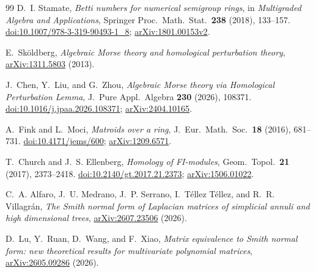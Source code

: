 \documentclass[11pt]{article}
\theoremstyle{definition}
\theoremstyle{remark}
\begin{document}
\begin{thebibliography}{99}
D.~I. Stamate,
\emph{Betti numbers for numerical semigroup rings},
in \emph{Multigraded Algebra and Applications}, Springer Proc.\ Math.\ Stat.\ \textbf{238} (2018), 133--157.
\href{https://doi.org/10.1007/978-3-319-90493-1_8}{doi:10.1007/978-3-319-90493-1\_8};
\href{https://arxiv.org/abs/1801.00153}{arXiv:1801.00153v2}.

E.~Sk\"oldberg,
\emph{Algebraic Morse theory and homological perturbation theory},
\href{https://arxiv.org/abs/1311.5803}{arXiv:1311.5803} (2013).

J.~Chen, Y.~Liu, and G.~Zhou,
\emph{Algebraic Morse theory via Homological Perturbation Lemma},
J.\ Pure Appl.\ Algebra \textbf{230} (2026), 108371.
\href{https://doi.org/10.1016/j.jpaa.2026.108371}{doi:10.1016/j.jpaa.2026.108371};
\href{https://arxiv.org/abs/2404.10165}{arXiv:2404.10165}.

A.~Fink and L.~Moci,
\emph{Matroids over a ring},
J.\ Eur.\ Math.\ Soc.\ \textbf{18} (2016), 681--731.
\href{https://doi.org/10.4171/jems/600}{doi:10.4171/jems/600};
\href{https://arxiv.org/abs/1209.6571}{arXiv:1209.6571}.

T.~Church and J.~S. Ellenberg,
\emph{Homology of FI-modules},
Geom.\ Topol.\ \textbf{21} (2017), 2373--2418.
\href{https://doi.org/10.2140/gt.2017.21.2373}{doi:10.2140/gt.2017.21.2373};
\href{https://arxiv.org/abs/1506.01022}{arXiv:1506.01022}.

C.~A. Alfaro, J.~U. Medrano, J.~P. Serrano, I.~T\'ellez T\'ellez, and R.~R. Villagr\'an,
\emph{The Smith normal form of Laplacian matrices of simplicial annuli and high dimensional trees},
\href{https://arxiv.org/abs/2607.23506}{arXiv:2607.23506} (2026).

D.~Lu, Y.~Ruan, D.~Wang, and F.~Xiao,
\emph{Matrix equivalence to Smith normal form: new theoretical results for multivariate polynomial matrices},
\href{https://arxiv.org/abs/2605.09286}{arXiv:2605.09286} (2026).
\end{thebibliography}
\end{document}
